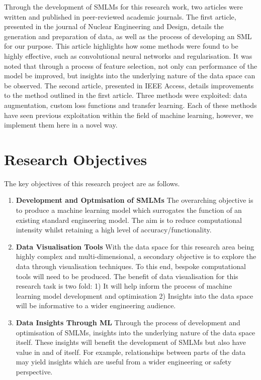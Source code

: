 \noindent
Through the development of SMLMs for this research work, two articles were written and published in peer-reviewed academic journals. The first article, presented in the journal of Nuclear Engineering and Design, details the generation and preparation of data, as well as the process of developing an SML for our purpose. This article highlights how some methods were found to be highly effective, such as convolutional neural networks and regularisation. It was noted that through a process of feature selection, not only can performance of the model be improved, but insights into the underlying nature of the data space can be observed. The second article, presented in IEEE Access, details improvements to the method outlined in the first article. Three methods were exploited: data augmentation, custom loss functions and transfer learning. Each of these methods have seen previous exploitation within the field of machine learning, however, we implement them here in a novel way. 


\section{Research Objectives}

The key objectives of this research project are as follows.

\begin{enumerate}
	\item \textbf{Development and Optmisation of SMLMs} The overarching objective is to produce a machine learning model which surrogates the function of an existing standard engineering model. The aim is to reduce computational intensity whilst retaining a high level of accuracy/functionality. 
	
	\item \textbf{Data Visualisation Tools} With the data space for this research area being highly complex and multi-dimensional, a secondary objective is to explore the data through visualisation techniques. To this end, bespoke computational tools will need to be produced. The benefit of data visualisation for this research task is two fold: 1) It will help inform the process of machine learning model development and optimisation 2) Insights into the data space will be informative to a wider engineering audience.
	
	\item \textbf{Data Insights Through ML} Through the process of development and optimisation of SMLMs, insights into the underlying nature of the data space itself. These insights will benefit the development of SMLMs but also have value in and of itself. For example, relationships between parts of the data may yield insights which are useful from a wider engineering or safety perspective. 
	
	
\end{enumerate}

